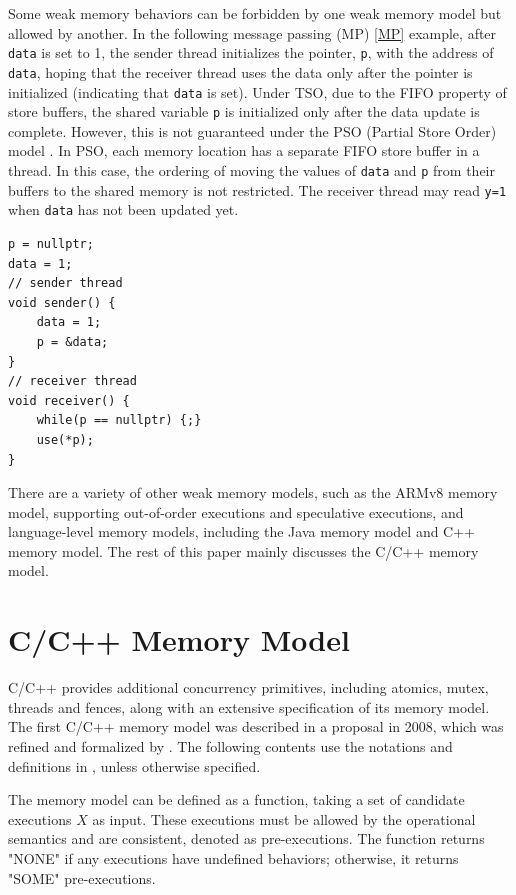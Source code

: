 Some weak memory behaviors can be forbidden by one weak memory model but allowed by another. In the following message passing (MP) \ref{MP} example, after \texttt{data} is set to 1, the sender thread initializes the pointer, \texttt{p}, with the address of \texttt{data}, hoping that the receiver thread uses the data only after the pointer is initialized (indicating that \texttt{data} is set). Under TSO, due to the FIFO property of store buffers, the shared variable \texttt{p} is initialized only after the data update is complete. However, this is not guaranteed under the PSO (Partial Store Order) model \cite{PSO}. In PSO, each memory location has a separate FIFO store buffer in a thread. In this case, the ordering of moving the values of \texttt{data} and \texttt{p} from their buffers to the shared memory is not restricted. The receiver thread may read \texttt{y=1} when \texttt{data} has not been updated yet.

\begin{lstlisting}[caption={Store Buffer (SB) program}, label={MP}]
p = nullptr;
data = 1;
// sender thread
void sender() {
    data = 1;
    p = &data;
}
// receiver thread
void receiver() {
    while(p == nullptr) {;}
    use(*p);
}
\end{lstlisting}


There are a variety of other weak memory models, such as the ARMv8 \cite{ARMv8} memory model, supporting out-of-order executions and speculative executions, and language-level  memory models, including the Java memory model\cite{java} and C++ memory model. The rest of this paper mainly discusses the C/C++ memory model\cite{c++model}.



\section{C/C++ Memory Model}
C/C++ provides additional concurrency primitives, including atomics, mutex, threads and fences, along with an extensive specification of its memory model.
The first C/C++ memory model was described in a proposal\cite{c++model-proposal} in 2008, which was refined and formalized by \cite{c++model}. The following contents use the notations and definitions in \cite{c++model}, unless otherwise specified.

The memory model can be defined as a function, taking a set of candidate executions $X$ as input. These executions must be allowed by the operational semantics and are consistent, denoted as pre-executions. The function returns "NONE" if any executions have undefined behaviors; otherwise, it returns "SOME" pre-executions.

